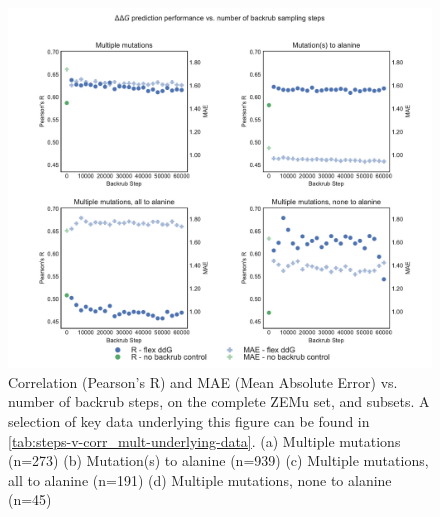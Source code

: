\begin{figure}
  \includegraphics[width=\textwidth,keepaspectratio]{steps-v-corr_mult.pdf}
  \caption[Flex ddG performance vs. number of backrub steps]{
    Correlation (Pearson's R) and MAE (Mean Absolute Error) vs. number of backrub steps, on the complete ZEMu set, and subsets.
    A selection of key data underlying this figure can be found in \cref{tab:steps-v-corr_mult-underlying-data}.
    (a) Multiple mutations (n=273)
    (b) Mutation(s) to alanine (n=939)
    (c) Multiple mutations, all to alanine (n=191)
    (d) Multiple mutations, none to alanine (n=45)
  } \label{fig:steps-v-corr_mult}
\end{figure}
